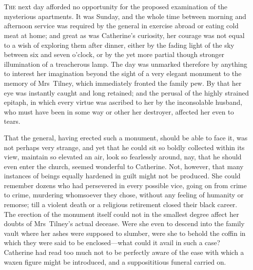 \chapter[Chapter \thechapter]{} 

 \lettrine{T}{he} next day afforded no opportunity for the proposed examination of the mysterious apartments. It was Sunday, and the whole time between morning and afternoon service was required by the general in exercise abroad or eating cold meat at home; and great as was Catherine's curiosity, her courage was not equal to a wish of exploring them after dinner, either by the fading light of the sky between six and seven o'clock, or by the yet more partial though stronger illumination of a treacherous lamp. The day was unmarked therefore by anything to interest her imagination beyond the sight of a very elegant monument to the memory of Mrs~Tilney, which immediately fronted the family pew. By that her eye was instantly caught and long retained; and the perusal of the highly strained epitaph, in which every virtue was ascribed to her by the inconsolable husband, who must have been in some way or other her destroyer, affected her even to tears. 

 That the general, having erected such a monument, should be able to face it, was not perhaps very strange, and yet that he could sit so boldly collected within its view, maintain so elevated an air, look so fearlessly around, nay, that he should even enter the church, seemed wonderful to Catherine. Not, however, that many instances of beings equally hardened in guilt might not be produced. She could remember dozens who had persevered in every possible vice, going on from crime to crime, murdering whomsoever they chose, without any feeling of humanity or remorse; till a violent death or a religious retirement closed their black career. The erection of the monument itself could not in the smallest degree affect her doubts of Mrs~Tilney's actual decease. Were she even to descend into the family vault where her ashes were supposed to slumber, were she to behold the coffin in which they were said to be enclosed—what could it avail in such a case? Catherine had read too much not to be perfectly aware of the ease with which a waxen figure might be introduced, and a supposititious funeral carried on. 

